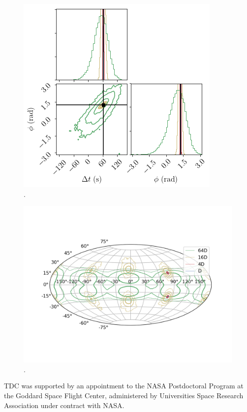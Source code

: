 \documentclass[aps,showpacs,twocolumn,prd,superscriptaddress,nofootinbib]{revtex4-1}
\begin{document}
\begin{figure}
\begin{minipage}{.32\linewidth}
   \end{minipage}
   \begin{minipage}{.32\linewidth}
      \includegraphics[width=.99\linewidth]{../plots/corner_smbh_case9_hm_dseries_tphi.png}
   \end{minipage}
  \caption{.}
  \label{fig:smbhCornerZoomHMCase9}
\end{figure}

\begin{figure}
  \centering
  \includegraphics[width=.8\linewidth]{../plots/plot_mollweide_dseries.png}
  \caption{.}
  \label{fig:MollweidesmbhTserieshmCase9}
\end{figure}


\begin{acknowledgments}

TDC was supported by an appointment to the NASA Postdoctoral Program at the
Goddard Space Flight Center, administered by Universities Space Research
Association under contract with NASA.

\end{acknowledgments}


\end{document}

